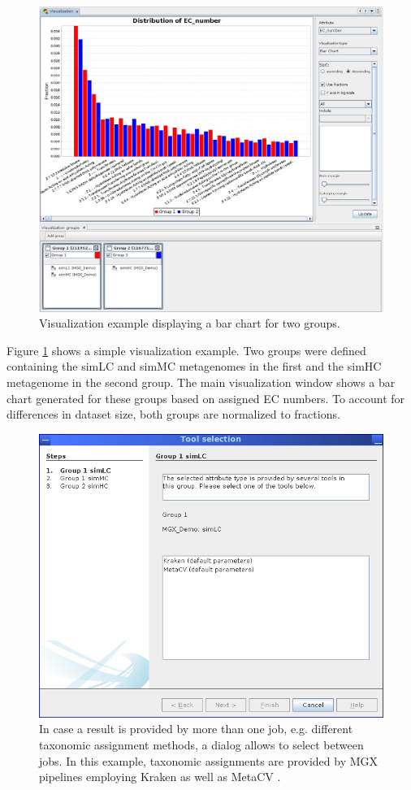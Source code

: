 \begin{figure}[H]
\centering
\includegraphics[width=\textwidth]{img/mgx/VizDemo}
\caption[Visualization example]{Visualization example displaying a bar chart for two groups.}
\label{viz3}
\end{figure}

Figure \ref{viz3} shows a simple visualization example. Two groups were defined containing the simLC and simMC metagenomes
in the first and the simHC metagenome in the second group. The main visualization window shows a bar chart
generated for these groups based on assigned EC numbers. To account for differences in dataset size, both
groups are normalized to fractions.

\begin{figure}[H]
\centering
\includegraphics[width=.8\textwidth]{img/mgx/ConflictResolver}
\caption[Job selection]{In case a result is provided by more than one job, e.g. different taxonomic assignment methods,
a dialog allows to select between jobs. In this example, taxonomic assignments are provided by MGX pipelines employing Kraken \cite{KRAKEN}
as well as MetaCV \cite{METACV}.}
\label{viz4}
\end{figure}

